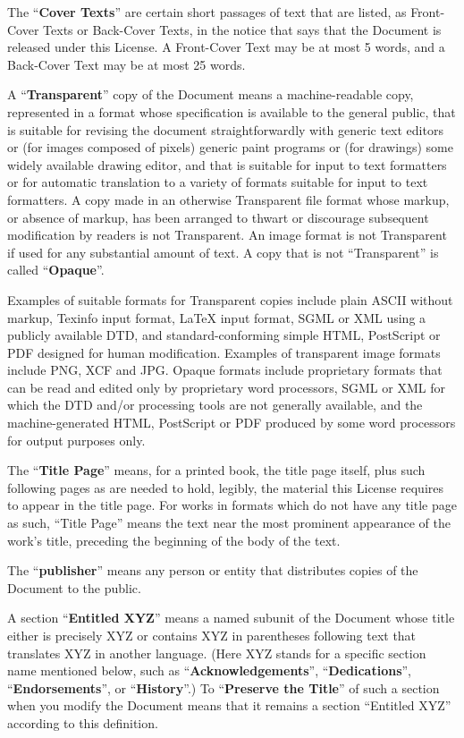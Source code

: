 \documentclass{article}
\begin{document}
	The ``\textbf{Cover Texts}'' are certain short passages of text that are listed,
	as Front-Cover Texts or Back-Cover Texts, in the notice that says that
	the Document is released under this License.  A Front-Cover Text may
	be at most 5 words, and a Back-Cover Text may be at most 25 words.
	
	A ``\textbf{Transparent}'' copy of the Document means a machine-readable copy,
	represented in a format whose specification is available to the
	general public, that is suitable for revising the document
	straightforwardly with generic text editors or (for images composed of
	pixels) generic paint programs or (for drawings) some widely available
	drawing editor, and that is suitable for input to text formatters or
	for automatic translation to a variety of formats suitable for input
	to text formatters.  A copy made in an otherwise Transparent file
	format whose markup, or absence of markup, has been arranged to thwart
	or discourage subsequent modification by readers is not Transparent.
	An image format is not Transparent if used for any substantial amount
	of text.  A copy that is not ``Transparent'' is called ``\textbf{Opaque}''.
	
	Examples of suitable formats for Transparent copies include plain
	ASCII without markup, Texinfo input format, LaTeX input format, SGML
	or XML using a publicly available DTD, and standard-conforming simple
	HTML, PostScript or PDF designed for human modification.  Examples of
	transparent image formats include PNG, XCF and JPG.  Opaque formats
	include proprietary formats that can be read and edited only by
	proprietary word processors, SGML or XML for which the DTD and/or
	processing tools are not generally available, and the
	machine-generated HTML, PostScript or PDF produced by some word
	processors for output purposes only.
	
	The ``\textbf{Title Page}'' means, for a printed book, the title page itself,
	plus such following pages as are needed to hold, legibly, the material
	this License requires to appear in the title page.  For works in
	formats which do not have any title page as such, ``Title Page'' means
	the text near the most prominent appearance of the work's title,
	preceding the beginning of the body of the text.
	
	The ``\textbf{publisher}'' means any person or entity that distributes
	copies of the Document to the public.
	
	A section ``\textbf{Entitled XYZ}'' means a named subunit of the Document whose
	title either is precisely XYZ or contains XYZ in parentheses following
	text that translates XYZ in another language.  (Here XYZ stands for a
	specific section name mentioned below, such as ``\textbf{Acknowledgements}'',
	``\textbf{Dedications}'', ``\textbf{Endorsements}'', or ``\textbf{History}''.)  
	To ``\textbf{Preserve the Title}''
	of such a section when you modify the Document means that it remains a
	section ``Entitled XYZ'' according to this definition.
	
\end{document}
